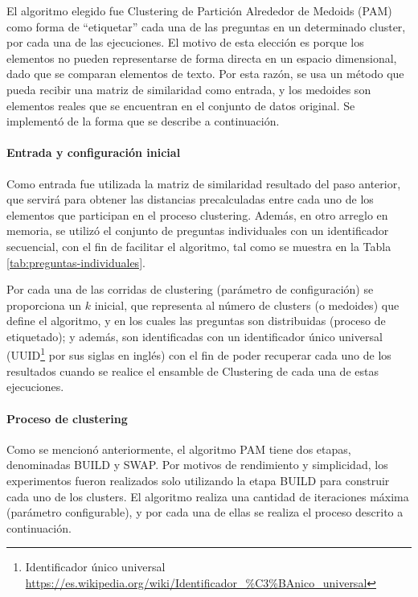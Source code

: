 \bigskip El algoritmo elegido fue Clustering de Partición Alrededor de Medoids (PAM) como forma de “etiquetar” cada una de las preguntas en un determinado cluster, por cada una de las ejecuciones. El motivo de esta elección es porque los elementos no pueden representarse de forma directa en un espacio dimensional, dado que se comparan elementos de texto. Por esta razón, se usa un método que pueda recibir una matriz de similaridad como entrada, y los medoides son elementos reales que se encuentran en el conjunto de datos original. Se implementó de la forma que se describe a continuación.

\paragraph{Entrada y configuración inicial}
Como entrada fue utilizada la matriz de similaridad resultado del paso anterior, que servirá para obtener las distancias precalculadas entre cada uno de los elementos que participan en el proceso clustering. Además, en otro arreglo en memoria, se utilizó el conjunto de preguntas individuales con un identificador secuencial, con el fin de facilitar el algoritmo, tal como se muestra en la Tabla \ref{tab:preguntas-individuales}.

\bigskip Por cada una de las corridas de clustering (parámetro de configuración) se proporciona un \(k\) inicial, que representa al número de clusters (o medoides) que define el algoritmo, y en los cuales las preguntas son distribuidas (proceso de etiquetado); y además, son identificadas con un identificador único universal (UUID\footnote{Identificador único universal \url{https://es.wikipedia.org/wiki/Identificador\_\%C3\%BAnico_universal}} por sus siglas en inglés) con el fin de poder recuperar cada uno de los resultados cuando se realice el ensamble de Clustering de cada una de estas ejecuciones.

\paragraph{Proceso de clustering}
Como se mencionó anteriormente, el algoritmo PAM tiene dos etapas, denominadas BUILD y SWAP. Por motivos de rendimiento y simplicidad, los experimentos fueron realizados solo utilizando la etapa BUILD para construir cada uno de los clusters. El algoritmo realiza una cantidad de iteraciones máxima (parámetro configurable), y por cada una de ellas se realiza el proceso descrito a continuación.

